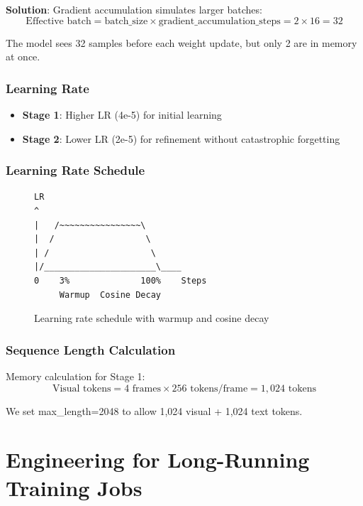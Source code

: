 \documentclass[11pt,a4paper]{article}
\begin{document}
\textbf{Solution}: Gradient accumulation simulates larger batches:
\begin{equation}
\text{Effective batch} = \text{batch\_size} \times \text{gradient\_accumulation\_steps} = 2 \times 16 = 32
\end{equation}

The model sees 32 samples before each weight update, but only 2 are in memory at once.

\subsubsection{Learning Rate}
\begin{itemize}
    \item \textbf{Stage 1}: Higher LR (4e-5) for initial learning
    \item \textbf{Stage 2}: Lower LR (2e-5) for refinement without catastrophic forgetting
\end{itemize}

\subsubsection{Learning Rate Schedule}

\begin{figure}[H]
\centering
\begin{tcolorbox}[colback=white,colframe=anthropicblue,width=0.8\textwidth]
\begin{verbatim}
LR
^
|   /~~~~~~~~~~~~~~~~\
|  /                  \
| /                    \
|/______________________\____
0    3%              100%    Steps
     Warmup  Cosine Decay
\end{verbatim}
\end{tcolorbox}
\caption{Learning rate schedule with warmup and cosine decay}
\end{figure}

\subsubsection{Sequence Length Calculation}
Memory calculation for Stage 1:
\begin{equation}
\text{Visual tokens} = 4 \text{ frames} \times 256 \text{ tokens/frame} = 1,024 \text{ tokens}
\end{equation}

We set max\_length=2048 to allow 1,024 visual + 1,024 text tokens.

\section{Engineering for Long-Running Training Jobs}
\end{document}
